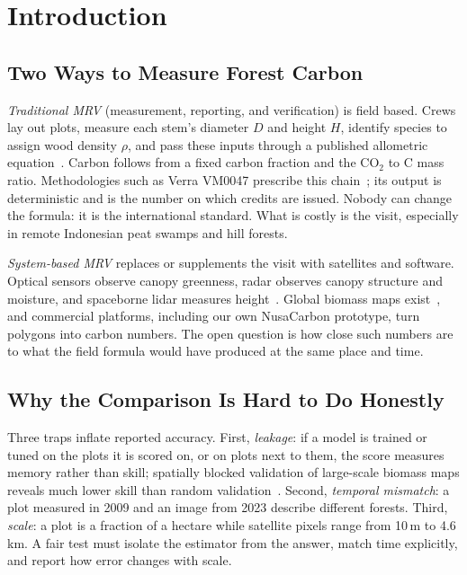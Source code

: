 \documentclass[conference,a4paper]{IEEEtran}
\begin{document}
\section{Introduction}

\subsection{Two Ways to Measure Forest Carbon}
\emph{Traditional MRV} (measurement, reporting, and verification) is field based. Crews lay out plots, measure each stem's diameter $D$ and height $H$, identify species to assign wood density $\rho$, and pass these inputs through a published allometric equation~\cite{chave2014improved}. Carbon follows from a fixed carbon fraction and the CO$_2$ to C mass ratio. Methodologies such as Verra VM0047 prescribe this chain~\cite{verra2025vm0047}; its output is deterministic and is the number on which credits are issued. Nobody can change the formula: it is the international standard. What is costly is the visit, especially in remote Indonesian peat swamps and hill forests.

\emph{System-based MRV} replaces or supplements the visit with satellites and software. Optical sensors observe canopy greenness, radar observes canopy structure and moisture, and spaceborne lidar measures height~\cite{dubayah2020gedi}. Global biomass maps exist~\cite{santoro2021global,spawn2020harmonized}, and commercial platforms, including our own NusaCarbon prototype, turn polygons into carbon numbers. The open question is how close such numbers are to what the field formula would have produced at the same place and time.

\subsection{Why the Comparison Is Hard to Do Honestly}
Three traps inflate reported accuracy. First, \emph{leakage}: if a model is trained or tuned on the plots it is scored on, or on plots next to them, the score measures memory rather than skill; spatially blocked validation of large-scale biomass maps reveals much lower skill than random validation~\cite{ploton2020spatial,roberts2017cv}. Second, \emph{temporal mismatch}: a plot measured in 2009 and an image from 2023 describe different forests. Third, \emph{scale}: a plot is a fraction of a hectare while satellite pixels range from 10\,m to 4.6\,km. A fair test must isolate the estimator from the answer, match time explicitly, and report how error changes with scale.
\end{document}
